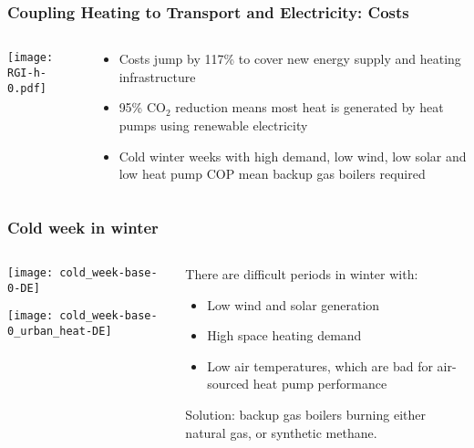 \documentclass[10pt,aspectratio=169,dvipsnames]{beamer}
\def\co2{CO${}_2$}
\let\olditem\item
\renewcommand{\item}{%
\olditem\vspace{5pt}}
\begin{document}
\begin{frame}
  \frametitle{Coupling Heating to Transport and Electricity: Costs}
  \begin{columns}[T]
    \begin{column}{9cm}
      \texttt{[image: RGI-h-0.pdf]}

    \end{column}
    \begin{column}{5cm}
      \begin{itemize}
      \item Costs jump by 117\% to cover new energy supply and heating infrastructure
      \item 95\% \co2{} reduction means most heat is generated by heat pumps using renewable electricity
      \item Cold winter weeks with high demand, low wind, low solar and low heat pump COP mean backup gas boilers required
      \end{itemize}
    \end{column}
  \end{columns}
\end{frame}


\begin{frame}
  \frametitle{Cold week in winter}

    \begin{columns}[T]
    \begin{column}{6cm}

  \centering
\texttt{[image: cold\_week-base-0-DE]}

\texttt{[image: cold\_week-base-0\_urban\_heat-DE]}
    \end{column}
    \begin{column}{7cm}
      \vspace{1.5cm}
        There are difficult periods in winter with:
        \begin{itemize}
        \item \alert{Low} wind and solar generation
        \item \alert{High} space heating demand
        \item \alert{Low} air temperatures, which are bad for air-sourced heat pump performance
        \end{itemize}

        Solution: \alert{backup gas boilers} burning either natural gas, or
        synthetic methane.
    \end{column}
    \end{columns}
\end{frame}
\end{document}

